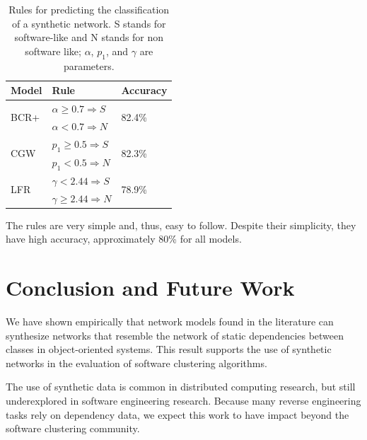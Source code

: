 \begin{table}
\caption{Rules for predicting the classification of a synthetic network. S
stands for software-like and N stands for non software like; $\alpha$, $p_1$, and $\gamma$ are parameters.}
\centering
\begin{tabular}{|l|l|l|}
\hline
Model & Rule & Accuracy \\
\hline 
\hline
\multirow{2}{*}{BCR+}
     & $\alpha \ge 0.7 \Rightarrow S$ & \multirow{2}{*}{82.4\%}  \\ 
     & $\alpha < 0.7 \Rightarrow N$ & \\ 
\hline
\multirow{2}{*}{CGW}
     & $p_1 \ge 0.5 \Rightarrow S$ & \multirow{2}{*}{82.3\%} \\  
     & $p_1 < 0.5 \Rightarrow N$ & \\  
\hline
\multirow{2}{*}{LFR}   
     & $\gamma < 2.44 \Rightarrow S$ & \multirow{2}{*}{78.9\%} \\ 
     & $\gamma \ge 2.44 \Rightarrow N$ & \\ 
\hline
\end{tabular}
\label{tab:rules}
\end{table}

The rules are very simple and, thus, easy to follow. Despite their simplicity,
they have high accuracy, approximately 80\% for all models.  


\section{Conclusion and Future Work} \label{sec:conclusion}

We have shown empirically that network models found in the literature can
synthesize networks that resemble the network of static dependencies between
classes in object-oriented systems. This result supports the use of synthetic
networks in the evaluation of software clustering algorithms.

The use of synthetic data is common in distributed computing research, but
still underexplored in software engineering research. Because many reverse
engineering tasks rely on dependency data, we expect this
work to have impact beyond the software clustering community.

